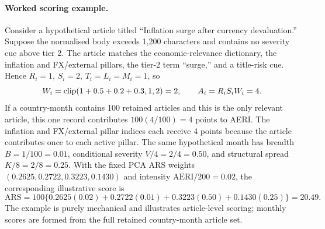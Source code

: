 \paragraph{Worked scoring example.}
Consider a hypothetical article titled ``Inflation surge after currency devaluation.'' Suppose the normalised body exceeds 1,200 characters and contains no severity cue above tier 2. The article matches the economic-relevance dictionary, the inflation and FX/external pillars, the tier-2 term ``surge,'' and a title-risk cue. Hence $R_i=1$, $S_i=2$, $T_i=L_i=M_i=1$, so
\[
W_i=\operatorname{clip}(1+0.5+0.2+0.3,1,2)=2,
\qquad A_i=R_iS_iW_i=4.
\]
If a country-month contains 100 retained articles and this is the only relevant article, this one record contributes $100(4/100)=4$ points to AERI. The inflation and FX/external pillar indices each receive 4 points because the article contributes once to each active pillar. The same hypothetical month has breadth $B=1/100=0.01$, conditional severity $V/4=2/4=0.50$, and structural spread $K/8=2/8=0.25$. With the fixed PCA ARS weights $(0.2625,0.2722,0.3223,0.1430)$ and intensity $\mathrm{AERI}/200=0.02$, the corresponding illustrative score is
\[
\mathrm{ARS}=100\{0.2625(0.02)+0.2722(0.01)+0.3223(0.50)+0.1430(0.25)\}=20.49.
\]
The example is purely mechanical and illustrates article-level scoring; monthly scores are formed from the full retained country-month article set.
